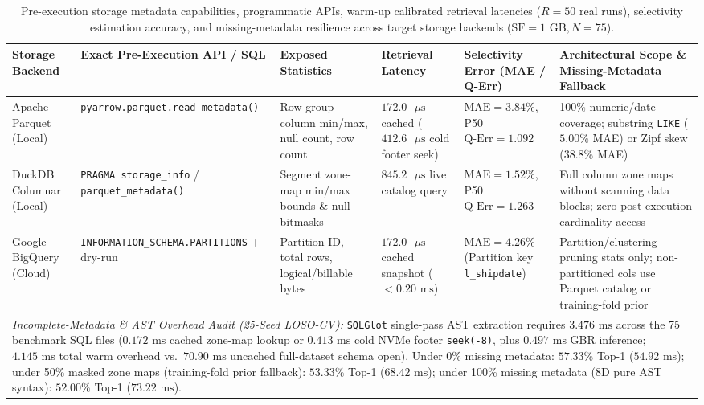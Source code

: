 \documentclass[10pt,a4paper]{article}
\begin{document}
\begingroup
\renewcommand{\thetable}{2B}
\begin{table}[t!]
\centering
\caption{Pre-execution storage metadata capabilities, programmatic APIs, warm-up calibrated retrieval latencies ($R=50$ real runs), selectivity estimation accuracy, and missing-metadata resilience across target storage backends ($\text{SF}=1\text{ GB}, N=75$).}
\label{tab:metadata_scope_audit}
\footnotesize
\setlength{\tabcolsep}{4pt}
\renewcommand{\arraystretch}{1.12}
\begin{tabular}{p{2.2cm}p{2.9cm}p{2.8cm}p{2.2cm}p{2.3cm}p{3.6cm}}
\hline
\textbf{Storage Backend} & \textbf{Exact Pre-Execution API / SQL} & \textbf{Exposed Statistics} & \textbf{Retrieval Latency} & \textbf{Selectivity Error (MAE / Q-Err)} & \textbf{Architectural Scope \& Missing-Metadata Fallback} \\
\hline
Apache Parquet (Local) & \texttt{pyarrow.parquet.}\newline\texttt{read\_metadata()} & Row-group column min/max, null count, row count & $172.0\text{ }\mu\text{s}$ cached ($412.6\text{ }\mu\text{s}$ cold footer seek) & $\text{MAE}=3.84\%$, P50 $\text{Q-Err}=1.092$ & 100\% numeric/date coverage; substring \texttt{LIKE} ($5.00\%$ MAE) or Zipf skew ($38.8\%$ MAE) \\
DuckDB Columnar (Local) & \texttt{PRAGMA storage\_info} / \texttt{parquet\_}\newline\texttt{metadata()} & Segment zone-map min/max bounds \& null bitmasks & $845.2\text{ }\mu\text{s}$ live catalog query & $\text{MAE}=1.52\%$, P50 $\text{Q-Err}=1.263$ & Full column zone maps without scanning data blocks; zero post-execution cardinality access \\
Google BigQuery (Cloud) & \texttt{INFORMATION\_SCHEMA.}\newline\texttt{PARTITIONS} + dry-run & Partition ID, total rows, logical/billable bytes & $172.0\text{ }\mu\text{s}$ cached snapshot ($<0.20\text{ ms}$) & $\text{MAE}=4.26\%$ (Partition key \texttt{l\_shipdate}) & Partition/clustering pruning stats only; non-partitioned cols use Parquet catalog or training-fold prior \\
\hline
\multicolumn{6}{p{16.2cm}}{\footnotesize \textit{Incomplete-Metadata \& AST Overhead Audit (25-Seed LOSO-CV):} \texttt{SQLGlot} single-pass AST extraction requires $3.476\text{ ms}$ across the 75 benchmark SQL files ($0.172\text{ ms}$ cached zone-map lookup or $0.413\text{ ms}$ cold NVMe footer \texttt{seek(-8)}, plus $0.497\text{ ms}$ GBR inference; $4.145\text{ ms}$ total warm overhead vs.\ $70.90\text{ ms}$ uncached full-dataset schema open). Under 0\% missing metadata: $57.33\%$ Top-1 ($54.92\text{ ms}$); under 50\% masked zone maps (training-fold prior fallback): $53.33\%$ Top-1 ($68.42\text{ ms}$); under 100\% missing metadata (8D pure AST syntax): $52.00\%$ Top-1 ($73.22\text{ ms}$).} \\
\hline
\end{tabular}
\end{table}
\addtocounter{table}{-1}
\endgroup
\end{document}
